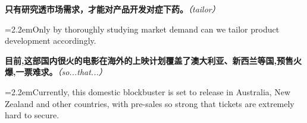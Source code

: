 \documentclass[11pt,a4paper]{article}
\newcommand{\num}[1]{\makebox[1.9em][r]{#1.}\hspace{0.3em}}
\newcommand{\prompt}[1]{\emph{\textcolor{tipblue}{\small（#1）}}}
\begin{document}
\begin{minipage}{\linewidth}

\num{11}\textbf{只有研究透市场需求，才能对产品开发对症下药。}\prompt{tailor}

\vspace{0.15em}

\noindent\hangindent=2.2em\hspace{2.2em}Only by thoroughly studying market demand can we tailor product development accordingly.

\end{minipage}

\begin{minipage}{\linewidth}

\num{12}\textbf{目前,这部国内很火的电影在海外的上映计划覆盖了澳大利亚、新西兰等国,预售火爆,一票难求。}\prompt{so...that...}

\vspace{0.15em}

\noindent\hangindent=2.2em\hspace{2.2em}Currently, this domestic blockbuster is set to release in Australia, New Zealand and other countries, with pre-sales so strong that tickets are extremely hard to secure.

\end{minipage}
\end{document}
